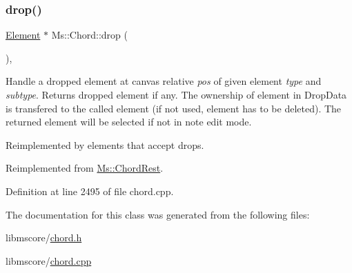 \subsubsection{\texorpdfstring{drop()}{drop()}}
{\footnotesize\ttfamily \hyperlink{class_ms_1_1_element}{Element} $\ast$ Ms\+::\+Chord\+::drop (\begin{DoxyParamCaption}\item[{\hyperlink{class_ms_1_1_edit_data}{Edit\+Data} \&}]{ }\end{DoxyParamCaption})\hspace{0.3cm}{\ttfamily [override]}, {\ttfamily [virtual]}}

Handle a dropped element at canvas relative {\itshape pos} of given element {\itshape type} and {\itshape subtype}. Returns dropped element if any. The ownership of element in Drop\+Data is transfered to the called element (if not used, element has to be deleted). The returned element will be selected if not in note edit mode.

Reimplemented by elements that accept drops. 

Reimplemented from \hyperlink{class_ms_1_1_chord_rest_a1277a12746bf12af5cbf79d95ada6a21}{Ms\+::\+Chord\+Rest}.



Definition at line 2495 of file chord.\+cpp.



The documentation for this class was generated from the following files\+:\begin{DoxyCompactItemize}
\item 
libmscore/\hyperlink{chord_8h}{chord.\+h}\item 
libmscore/\hyperlink{chord_8cpp}{chord.\+cpp}\end{DoxyCompactItemize}
